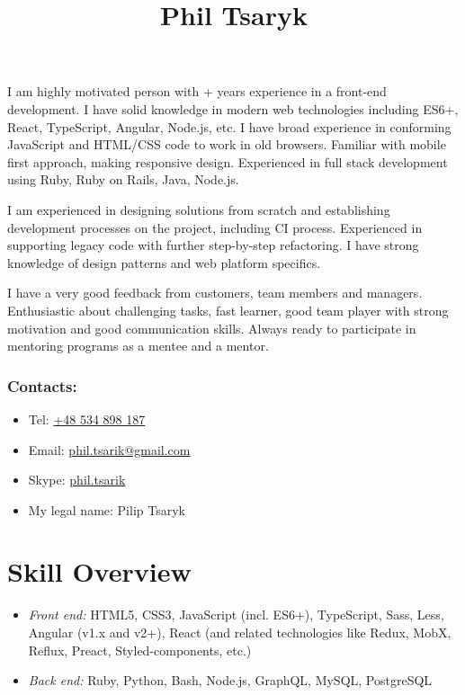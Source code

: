 \documentclass[a4paper, 12pt]{article}
\title{Phil Tsaryk}
\author{}
\date{}
\newcommand{\itemlabel}[1]{
    \textit{#1:}}
\newcommand{\defvalue}[2]{\ifx#1\empty#2\else#1\fi}
\newcommand{\yearsexp}{%
    \FPeval{\result}{clip(\the\year - 2011)}%
    \defvalue{\result}{6+}}
\begin{document}
\maketitle

I am highly motivated person with \yearsexp{} years experience in a front-end development.
I have solid knowledge in modern web technologies including ES6+, React, TypeScript, Angular, Node.js, etc.
I have broad experience in conforming JavaScript and HTML/CSS code to work in old browsers.
Familiar with mobile first approach, making responsive design.
Experienced in full stack development using Ruby, Ruby on Rails, Java, Node.js.

I am experienced in designing solutions from scratch and establishing development processes on the project, including CI process.
Experienced in supporting legacy code with further step-by-step refactoring.
I have strong knowledge of design patterns and web platform specifics.

I have a very good feedback from customers, team members and managers.
Enthusiastic about challenging tasks, fast learner, good team player with strong motivation and good communication skills.
Always ready to participate in mentoring programs as a mentee and a mentor.

\subsubsection*{Contacts:}
\begin{itemize}
    \item Tel: \href{tel:+48534898187}{+48 534 898 187}
    \item Email: \href{mailto:phil.tsarik@gmail.com}{phil.tsarik@gmail.com}
    \item Skype: \href{callto:phil.tsarik}{phil.tsarik}
    \item My legal name: Pilip Tsaryk
\end{itemize}


\section*{Skill Overview}

    \begin{itemize}
        \item \itemlabel{Front end} HTML5, CSS3, JavaScript (incl. ES6+), TypeScript, Sass, Less, Angular (v1.x and v2+), React (and related technologies like Redux, MobX, Reflux, Preact, Styled-components, etc.)
        \item \itemlabel{Back end} Ruby, Python, Bash, Node.js, GraphQL, MySQL, PostgreSQL
    \end{itemize}
\end{document}
